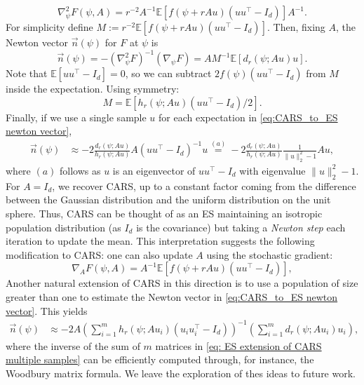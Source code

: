 \begin{equation} \label{eq:CARS_to_ES hessian wrt psi}
    \nabla_{\psi}^2 F(\psi,A) = r^{-2} A^{-1}\mathbb{E}[f(\psi+r A u) (u u^{\top} - I_d)]A^{-1}.
\end{equation}
For simplicity define $M := r^{-2}\mathbb{E}[f(\psi + r A u)(u u^{\top}-I_d)]$.
Then, fixing $A$, the Newton vector $\vec{n}(\psi)$ for $F$ at $\psi$ is
\begin{equation}\label{eq:CARS_to_ES newton vector}
    \vec{n}(\psi) =    -(\nabla_{\psi}^2 F)^{-1}(\nabla_{\psi} F)
    = A M^{-1} \mathbb{E}[d_r(\psi; Au)u].
\end{equation}
Note that $\mathbb{E}[u u^{\top} - I_d] = 0$, so we can subtract $2f(\psi)(u u^{\top} - I_d)$ from $M$ inside the expectation. Using symmetry:
\begin{equation*}
    M = \mathbb{E}[h_r(\psi; Au)(u u^{\top}-I_d)/2].
\end{equation*}
Finally, if we use a single sample $u$ for each expectation in \eqref{eq:CARS_to_ES newton vector},
\begin{align*}
    \vec{n}(\psi) & \approx -2\frac{d_r (\psi;Au)}{h_r (\psi;Au)} A(u u^{\top}-I_d)^{-1}u \stackrel{(a)}{=} - 2\frac{d_r (\psi;Au)}{h_r (\psi;Au)} \frac{1}{\|u\|_2^2 - 1}Au,
\end{align*}
where $(a)$ follows as $u$ is an eigenvector of $u u^{\top} - I_d$ with eigenvalue $\|u\|_2^2 - 1$.
For $A=I_d$, we recover CARS, up to a constant factor
coming from the difference between the Gaussian distribution and the uniform distribution on the unit sphere. Thus, CARS can be thought of as an ES maintaining an isotropic population distribution (as $I_d$ is the covariance) but taking a {\em Newton step} each iteration to update the mean. This interpretation suggests the following modification to CARS: one can also update $A$ using the stochastic gradient:
\begin{equation}\label{eq: ES covariance update}
    \nabla_{A}F(\psi,A) = 
    A^{-1}\mathbb{E}[f(\psi+r A u) (u u^{\top} - I_d)],
\end{equation}
Another natural extension of CARS in this direction is to use a population of size greater than one to estimate the Newton vector in \eqref{eq:CARS_to_ES newton vector}. This yields
\begin{align}\label{eq: ES extension of CARS multiple samples}
    \vec{n}(\psi) & \approx -2 A \left(\sum_{i=1}^{m} h_r (\psi; Au_i)(u_i u_i^{\top} - I_d)\right)^{-1} \left(\sum_{i=1}^{m} d_r (\psi; A u_i)u_i \right),
\end{align}
where the inverse of the sum of $m$ matrices in \eqref{eq: ES extension of CARS multiple samples} can be efficiently computed through, for instance, the Woodbury matrix formula.
We leave the exploration of thes ideas to future work.

